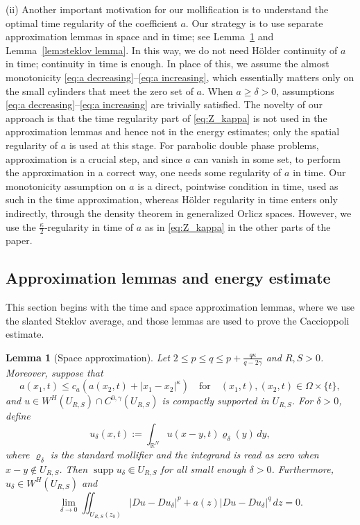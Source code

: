 \documentclass[10pt,a4paper]{amsart}
\newtheorem{lemma}[theorem]{Lemma}
\numberwithin{equation}{section}
\newcommand{\RR}{\mathds{R}}
\DeclareMathOperator*{\supp}{supp}
\begin{document}
(ii) Another important motivation for our mollification is to understand the optimal time regularity of the coefficient $a$. Our strategy is to use separate approximation lemmas in space and in time; see Lemma~\ref{lem: spcae approximation} and Lemma~\ref{lem:steklov lemma}. In this way, we do not need H\"older continuity of $a$ in time; continuity in time is enough. In place of this, we assume the almost monotonicity \eqref{eq:a decreasing}--\eqref{eq:a increasing}, which essentially matters only on the small cylinders that meet the zero set of $a$. When $a \geq \delta > 0$, assumptions \eqref{eq:a decreasing}--\eqref{eq:a increasing} are trivially satisfied. The novelty of our approach is that the time regularity part of \eqref{eq:Z_kappa} is not used in the approximation lemmas and hence not in the energy estimates; only the spatial regularity of $a$ is used at this stage. For parabolic double phase problems, approximation is a crucial step, and since $a$ can vanish in some set, to perform the approximation in a correct way, one needs some regularity of $a$ in time. Our monotonicity assumption on $a$ is a direct, pointwise condition in time, used as such in the time approximation, whereas H\"older regularity in time enters only indirectly, through the density theorem in generalized Orlicz spaces. However, we use the $\frac{\kappa}{2}$-regularity in time of $a$ as in \eqref{eq:Z_kappa} in the other parts of the paper. 


 \subsection{Approximation lemmas and energy estimate} This section begins with the time and space approximation lemmas, where we use the slanted Steklov average, and those lemmas are used to prove the Caccioppoli estimate.

 \begin{lemma}[Space approximation]\label{lem: spcae approximation}
Let $2\leq p\leq q\leq p+\frac{q\kappa}{q-2\gamma}$ and $R,S>0$. Moreover, suppose
that 
\[a(x_1, t)\leq c_a \left(a(x_2, t)+|x_1-x_2|^{\kappa}\right)\quad \text{for}\quad (x_1, t), (x_2, t)\in \Omega\times \{t\},\] and 
$u\in W^{H}(U_{R, S})\cap C^{0, \gamma}(U_{R, S})$ is compactly
supported in $U_{R, S}$. For $\delta>0$, define
\[
u_{\delta}(x,t):=\int_{\RR^{N}}u\left(x-y,t\right)\varrho_{\delta}(y)\,dy,
\]
where $\varrho_{\delta}$ is the standard mollifier and the integrand
is read as zero when $x-y\not\in U_{R, S}$. Then $\supp u_{\delta}\Subset U_{R, S}$
for all small enough $\delta>0$. Furthermore, $u_{\delta}\in W^{H}(U_{R, S})$ and
\begin{equation}
\lim_{\delta\rightarrow0}\iint_{U_{R, S}(z_0)}\left|Du-Du_{\delta}\right|^{p}+a(z)\left|Du-Du_{\delta}\right|^{q}\, dz=0.\label{eq:space approx grad conv}
\end{equation}
\end{lemma}
\end{document}
